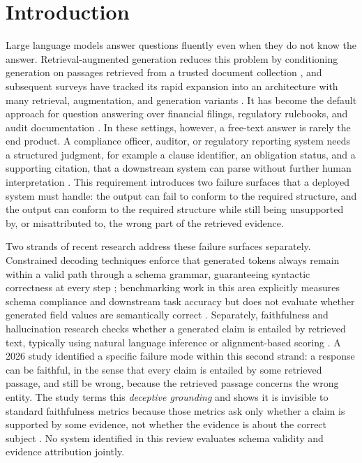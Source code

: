 \documentclass[10pt,twocolumn,letterpaper]{article}
\begin{document}
\vspace{1em}

\section{Introduction}

Large language models answer questions fluently even when they do not know the answer. Retrieval-augmented generation reduces this problem by conditioning generation on passages retrieved from a trusted document collection \cite{lewis}, and subsequent surveys have tracked its rapid expansion into an architecture with many retrieval, augmentation, and generation variants \cite{gao}. It has become the default approach for question answering over financial filings, regulatory rulebooks, and audit documentation \cite{finsage,rkefino1,rirag}. In these settings, however, a free-text answer is rarely the end product. A compliance officer, auditor, or regulatory reporting system needs a structured judgment, for example a clause identifier, an obligation status, and a supporting citation, that a downstream system can parse without further human interpretation \cite{pwcverif}. This requirement introduces two failure surfaces that a deployed system must handle: the output can fail to conform to the required structure, and the output can conform to the required structure while still being unsupported by, or misattributed to, the wrong part of the retrieved evidence.

Two strands of recent research address these failure surfaces separately. Constrained decoding techniques enforce that generated tokens always remain within a valid path through a schema grammar, guaranteeing syntactic correctness at every step \cite{xgrammar}; benchmarking work in this area explicitly measures schema compliance and downstream task accuracy but does not evaluate whether generated field values are semantically correct \cite{jsonbench}. Separately, faithfulness and hallucination research checks whether a generated claim is entailed by retrieved text, typically using natural language inference or alignment-based scoring \cite{franq,sirg,ragas,alignscore}. A 2026 study identified a specific failure mode within this second strand: a response can be faithful, in the sense that every claim is entailed by some retrieved passage, and still be wrong, because the retrieved passage concerns the wrong entity. The study terms this \emph{deceptive grounding} and shows it is invisible to standard faithfulness metrics because those metrics ask only whether a claim is supported by some evidence, not whether the evidence is about the correct subject \cite{deceptive}. No system identified in this review evaluates schema validity and evidence attribution jointly.
\end{document}
